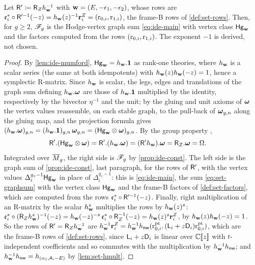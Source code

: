 \begin{prop}
\label{prop:ide-frameB}
Let $\mathsf{R}'\coloneqq\mathsf{R}_{Z}h_{\mathbf{w}}^{-1}$ with $\mathbf{w}=(E,-\epsilon_1,-\epsilon_2)$, whose rows are $\mathfrak{e}_i^*\circ\mathsf{R}'^{-1}(-z)=h_{\mathbf{w}}(z)^{-1}\mathbf{r}^Z_i=(\mathrm{r}_{0,i},\mathrm{r}_{1,i})$, the frame-B rows of \cref{def:set-rows}. Then, for $g\geq 2$, $\mathscr{F}_g$ is the Hodge-vertex graph sum \cref{eq:ide-main} with vertex class $\mathsf{Hg}_{\mathbf{w}}$ and the factors computed from the rows $(\mathrm{r}_{0,i},\mathrm{r}_{1,i})$. The exponent $-1$ is derived, not chosen.
\end{prop}
\begin{proof}
By \cref{lem:ide-mumford}, $\mathsf{Hg}_{\mathbf{w}}=h_{\mathbf{w}}.\mathbf{1}$ as rank-one theories, where $h_{\mathbf{w}}$ is a scalar series (the same at both idempotents) with $h_{\mathbf{w}}(z)h_{\mathbf{w}}(-z)=1$, hence a symplectic R-matrix. Since $h_{\mathbf{w}}$ is scalar, the legs, edges and translations of the graph sum defining $h_{\mathbf{w}}.\boldsymbol{\omega}$ are those of $h_{\mathbf{w}}.\mathbf{1}$ multiplied by the identity, respectively by the bivector $\eta^{-1}$ and the unit; by the gluing and unit axioms of $\boldsymbol{\omega}$ the vertex values reassemble, on each stable graph, to the pull-back of $\boldsymbol{\omega}_{g,n}$ along the gluing map, and the projection formula gives $(h_{\mathbf{w}}.\boldsymbol{\omega})_{g,n}=(h_{\mathbf{w}}.\mathbf{1})_{g,n}\,\boldsymbol{\omega}_{g,n}=(\mathsf{Hg}_{\mathbf{w}}\otimes\boldsymbol{\omega})_{g,n}$.  By the group property \cite[Prop.~2.14]{PPZ15},
\[
\mathsf{R}'.(\mathsf{Hg}_{\mathbf{w}}\otimes\boldsymbol{\omega})=\mathsf{R}'.(h_{\mathbf{w}}.\boldsymbol{\omega})=(\mathsf{R}'h_{\mathbf{w}}).\boldsymbol{\omega}=\mathsf{R}_{Z}.\boldsymbol{\omega}=\Omega .
\]
Integrated over $\overline{M}_g$, the right side is $\mathscr{F}_g$ by \cref{prop:ide-const}. The left side is the graph sum of \cref{prop:ide-const}, last paragraph, for the rows of $\mathsf{R}'$, with the vertex values $\Delta_i^{g_v-1}\mathsf{Hg}_{\mathbf{w}}$ in place of $\Delta_i^{g_v-1}$: this is \cref{eq:ide-main}, the sum \cref{eq:set-graphsum} with the vertex class $\mathsf{Hg}_{\mathbf{w}}$ and the frame-B factors of \cref{def:set-factors}, which are computed from the rows $\mathfrak{e}_i^*\circ\mathsf{R}'^{-1}(-z)$. Finally, right multiplication of an R-matrix by the scalar $h_{\mathbf{w}}^s$ multiplies the rows by $h_{\mathbf{w}}(z)^s$: $\mathfrak{e}_i^*\circ(\mathsf{R}_{Z}h_{\mathbf{w}}^s)^{-1}(-z)=h_{\mathbf{w}}(-z)^{-s}\,\mathfrak{e}_i^*\circ\mathsf{R}_{Z}^{-1}(-z)=h_{\mathbf{w}}(z)^s\mathbf{r}^Z_i$, by $h_{\mathbf{w}}(z)h_{\mathbf{w}}(-z)=1$. So the rows of $\mathsf{R}'=\mathsf{R}_{Z}h_{\mathbf{w}}^{-1}$ are $h_{\mathbf{w}}^{-1}\mathbf{r}_i^Z=h_{\mathbf{w}}^{-1}h_{\mathsf{nw}}(\mathrm{r}^{\mathrm{pt}}_{0,i},(\mathsf{L}_i+z\mathsf{D}_i)\mathrm{r}^{\mathrm{pt}}_{0,i})$, which are the frame-B rows of \cref{def:set-rows}, since $\mathsf{L}_i+z\mathsf{D}_i$ is linear over $\mathbb{C}[\![ z ]\!]$ with $t$-independent coefficients and so commutes with the multiplication by $h_{\mathbf{w}}^{-1}h_{\mathsf{nw}}$; and $h_{\mathbf{w}}^{-1}h_{\mathsf{nw}}=h_{(\alpha_1,\mathsf{A},-E)}$ by \cref{lem:set-hmult}.
\end{proof}

